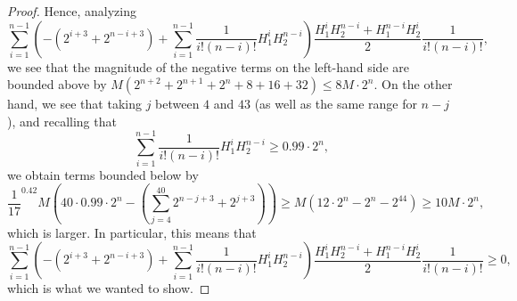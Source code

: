 \documentclass{article}
\theoremstyle{definition}
\theoremstyle{remark}
\begin{document}
\begin{proof}
\par Hence, analyzing \[\sum\limits_{i=1}^{n-1} \left(- (2^{i+3} + 2^{n-i+3}) + \sum\limits_{i=1}^{n-1} \frac{1}{i!(n-i)!}H_1^iH_2^{n-i}\right) \frac{H_1^iH_2^{n-i} + H_1^{n-i}H_2^i}{2} \frac{1}{i!(n-i)!},\] we see that the magnitude of the negative terms on the left-hand side are bounded above by $M(2^{n+2} + 2^{n+1} + 2^n + 8 + 16 + 32) \leq 8M\cdot 2^n.$ On the other hand, we see that taking $j$ between $4$ and $43$ (as well as the same range for $n-j$), and recalling that \[\sum\limits_{i=1}^{n-1} \frac{1}{i!(n-i)!}H_1^iH_2^{n-i} \geq 0.99 \cdot 2^n,\] we obtain terms bounded below by $$\frac{1}{17}^{0.42} M\left(40 \cdot 0.99\cdot2^n -  \left(\sum\limits_{j=4}^{40} 2^{n-j+3} + 2^{j + 3}\right)\right) \geq M(12 \cdot 2^n - 2^n - 2^{44}) \geq 10M\cdot 2^n,$$ which is larger. In particular, this means that \[\sum\limits_{i=1}^{n-1} \left(- (2^{i+3} + 2^{n-i+3}) + \sum\limits_{i=1}^{n-1} \frac{1}{i!(n-i)!}H_1^iH_2^{n-i}\right) \frac{H_1^iH_2^{n-i} + H_1^{n-i}H_2^i}{2} \frac{1}{i!(n-i)!} \geq 0,\] which is what we wanted to show.
\end{proof}
\end{document}
